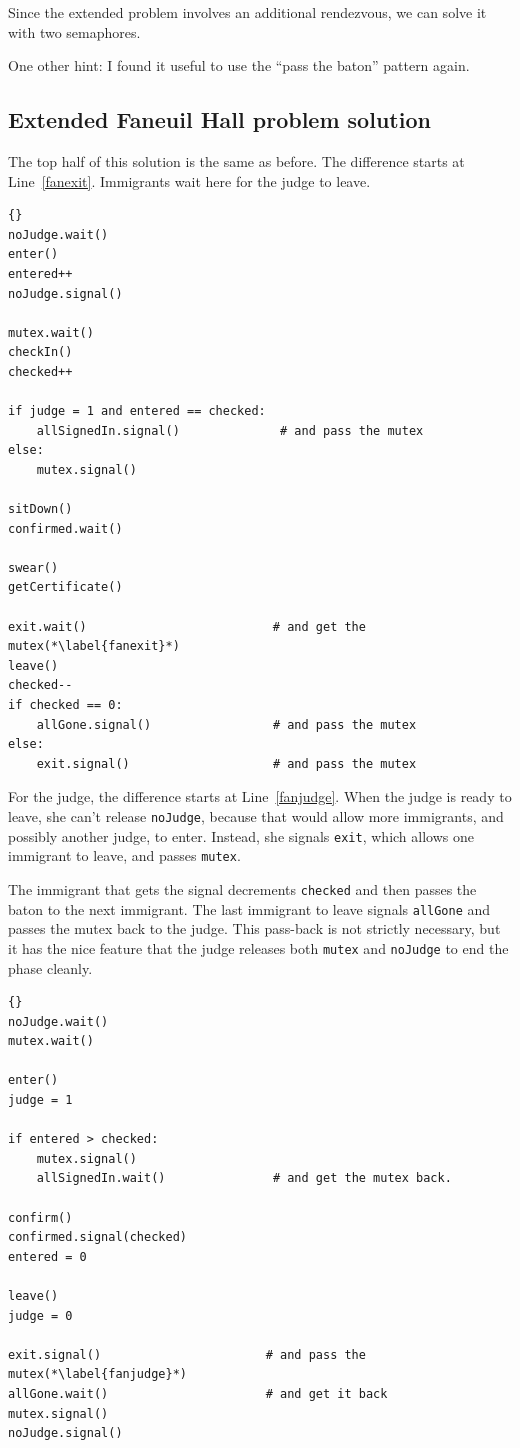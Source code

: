 \documentclass{book}
\newcommand{\clearemptydoublepage}{\newpage\cleardoublepage}
\begin{document}
Since the extended problem involves an additional rendezvous,
we can solve it with two semaphores.

One other hint: I found it useful to use the ``pass the baton''
pattern again.


\clearemptydoublepage
\subsection {Extended Faneuil Hall problem solution}

The top half of this solution is the same as before.  The
difference starts at Line~\ref{fanexit}.  Immigrants wait
here for the judge to leave.

\begin{lstlisting}[caption={Faneuil Hall problem solution (immigrant)}]{}
noJudge.wait()
enter()
entered++
noJudge.signal()

mutex.wait()
checkIn()
checked++

if judge = 1 and entered == checked:
    allSignedIn.signal()              # and pass the mutex
else:
    mutex.signal()

sitDown()
confirmed.wait()

swear()
getCertificate()

exit.wait()                          # and get the mutex(*\label{fanexit}*)
leave()
checked--
if checked == 0:
    allGone.signal()                 # and pass the mutex
else:
    exit.signal()                    # and pass the mutex
\end{lstlisting}

For the judge, the difference starts at Line~\ref{fanjudge}.
When the judge is ready to leave, she can't release {\tt noJudge},
because that would allow more immigrants, and possibly another
judge, to enter.  Instead, she signals {\tt exit}, which allows
one immigrant to leave, and passes {\tt mutex}.

The immigrant that gets the signal decrements {\tt checked} and
then passes the baton to the next immigrant.  The last immigrant
to leave signals {\tt allGone} and passes the mutex back to the
judge.  This pass-back is not strictly necessary, but it has
the nice feature that the judge releases both {\tt mutex}
and {\tt noJudge} to end the phase cleanly.

\newpage
\begin{lstlisting}[caption={Faneuil Hall problem solution (judge)}]{}
noJudge.wait()
mutex.wait()

enter()
judge = 1

if entered > checked:
    mutex.signal()
    allSignedIn.wait()               # and get the mutex back.

confirm()
confirmed.signal(checked)
entered = 0

leave()
judge = 0

exit.signal()                       # and pass the mutex(*\label{fanjudge}*)
allGone.wait()                      # and get it back
mutex.signal()
noJudge.signal()
\end{lstlisting}
\end{document}
